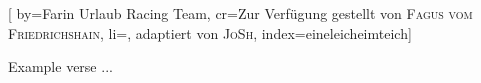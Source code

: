 

[%
    by={Farin Urlaub Racing Team},
    cr={Zur Verf\"{u}gung gestellt von \textsc{Fagus vom Friedrichshain}},
    li={, adaptiert von \textsc{JoSh}},
    index={eineleicheimteich}]


    \label{eineleicheimteich}

    \beginverse
        Example verse ...
    \endverse
\endsong

